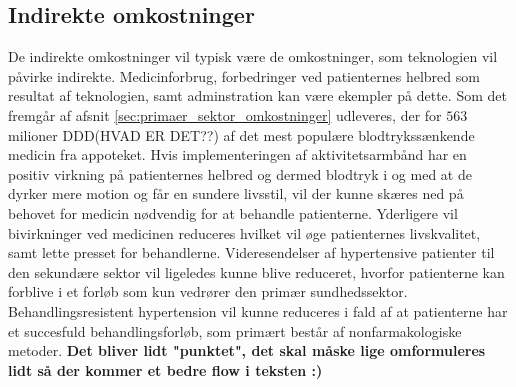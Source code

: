 \subsection{Indirekte omkostninger}
De indirekte omkostninger vil typisk være de omkostninger, som teknologien vil påvirke indirekte. Medicinforbrug, forbedringer ved patienternes helbred som resultat af teknologien, samt adminstration kan være ekempler på dette. 
Som det fremgår af afsnit \autoref{sec:primaer_sektor_omkostninger} udleveres, der for $563$ milioner DDD(HVAD ER DET??) af det mest populære blodtrykssænkende medicin fra appoteket. Hvis implementeringen af aktivitetsarmbånd har en positiv virkning på patienternes helbred og dermed blodtryk i og med at de dyrker mere motion og får en sundere livsstil, vil der kunne skæres ned på behovet for medicin nødvendig for at behandle patienterne. Yderligere vil bivirkninger ved medicinen reduceres hvilket vil øge patienternes livskvalitet, samt lette presset for behandlerne. 
Videresendelser af hypertensive patienter til den sekundære sektor vil ligeledes kunne blive reduceret, hvorfor patienterne kan forblive i et forløb som kun vedrører den primær sundhedssektor. Behandlingsresistent hypertension vil kunne reduceres i fald af at patienterne har et succesfuld behandlingsforløb, som primært består af nonfarmakologiske metoder.  \textbf{Det bliver lidt "punktet", det skal måske lige omformuleres lidt så der kommer et bedre flow i teksten :) }













\begin{comment}
Hvad koster et Fitbit Flex? 
Hvilke besparelser tilbydes der så sundhedsektoren? 

Hvad koster det så at introducere patienterne til teknologien? 
	Hvad dækker den her introduktion minimum over, for at kunne anvende armbåndet? (Anvendelse af app og hvordan den skal oplades.)
	
Hvad koster det hvis de har spørgsmål vedr. teknologien? 


Langsigtet omkostninger - hvis behandlingen hjælper/ikke hjælper
- Besparelser vedr. medicinering 
- Besparelser vedr. ambulant forløb 
- Forebyggelse af behandlingsresistent hypertension = $$$$



EVT: Dags-takster i sekundær sektor (Ambulant).



En model i almen praktsis for implementeringen af aktivitetsarmbånd?

Honorartabel = \citep{honorartabel2016}
\end{comment}